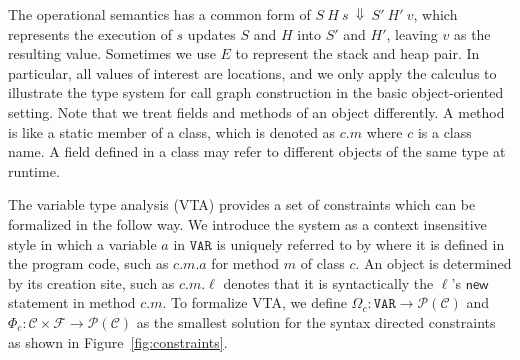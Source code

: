 \documentclass{llncs}
\newcommand\power{\mathcal{P}}
\newcommand{\keyword}[1]{\mathsf{#1}}
\newcommand{\Reducesto}[0]{ \ \Downarrow \ }
\newcommand{\kwnew}[0]{\keyword{new}}
\newcommand\Var{\mathtt{VAR}}
\begin{document}
The operational semantics has a common form of $S\ H\ s\Reducesto S'\ H'\ v$, which represents the execution of $s$
updates $S$ and $H$ into $S'$ and $H'$, leaving $v$ as the resulting value. Sometimes we use $E$ to represent the stack and heap pair.
In particular, all values of interest are locations, and we only apply the calculus to illustrate the type system
for call graph construction in the basic object-oriented setting. Note that we treat fields and methods of an object differently.
A method is like a static member of a class, which is denoted as $c.m$ where $c$ is a class name. A field defined in a class may
refer to different objects of the same type at runtime.


\newcommand{\VPT}{\Omega}
\newcommand{\HPT}{\Phi}
\newcommand{\Class}{\mathcal{C}}
\newcommand{\Field}{\mathcal{F}}
\newcommand{\bigO}{\mathcal{O}}
\newcommand{\word}[1]{\langle #1\rangle}
\newcommand{\Nat}{\mathbb{N}}

\newcommand{\less}{\sqsubseteq}
\newcommand{\tflow}{\dashrightarrow}
\newcommand{\hflow}{\rightarrow}
\newcommand{\lhflow}[1]{\stackrel{#1}{\hflow}}


The variable type analysis (VTA) provides a set of constraints which can be formalized in the follow way.
We introduce the system as a context insensitive style %
in which a variable $a$ in $\Var$ is uniquely referred to by where it is defined in the program code, such as $c.m.a$
for method $m$ of class $c$. An object is determined by its creation site, such as $c.m.\ell$ denotes
that it is syntactically the $\ell$'s $\kwnew$ statement in method $c.m$.
To formalize VTA, we define $\VPT_c:\Var\rightarrow\power(\Class)$ and $\HPT_c:\Class\times\Field\rightarrow\power(\Class)$
as the smallest solution for the syntax directed constraints as shown in Figure~\ref{fig:constraints}.
\end{document}
